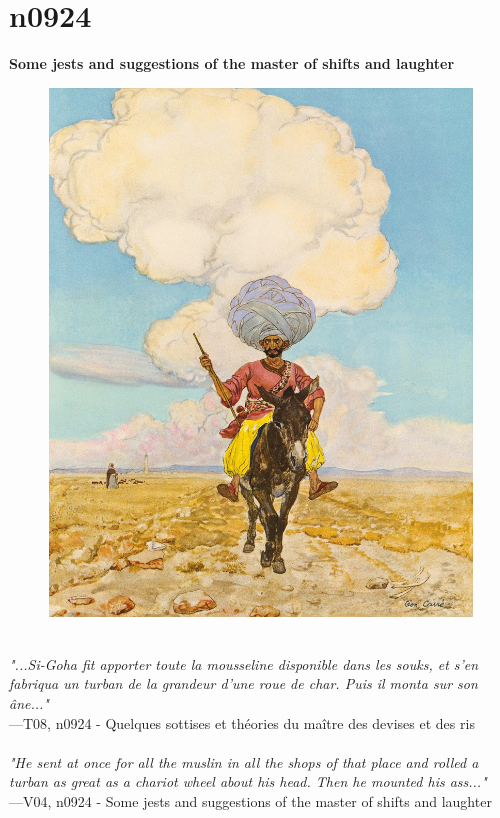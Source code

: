 \documentclass[../Carre_nights.tex]{subfiles}
\begin{document}
\newpage

\section{n0924}
\textbf{\Large{Some jests and suggestions of the master of shifts and laughter}} \\

\begin{figure}[ht]
\centering
\includegraphics[height=\figsize]{illustrations/volume_8/T08, n0924 - Quelques sottises et théories du maître des devises et des ris.jpg}
\end{figure}

\textit{\\
"...Si-Goha fit apporter toute la mousseline disponible dans les souks, et s’en fabriqua un turban de la grandeur d’une roue de char. Puis il monta sur son âne..."} \\
—T08, n0924 - Quelques sottises et théories du maître des devises et des ris \\~\\
\textit{"He sent at once for all the muslin in all the shops of that place and rolled a turban as great as a chariot wheel about his head. Then he mounted his ass..."} \\
—V04, n0924 - Some jests and suggestions of the master of shifts and laughter
\end{document}
